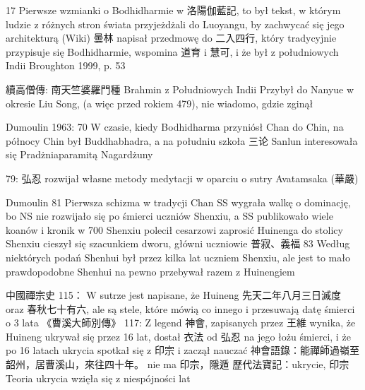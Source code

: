 17 Pierwsze wzmianki o Bodhidharmie w 洛陽伽藍記, to był tekst, w którym ludzie z różnych stron świata przyjeżdżali do Luoyangu, by zachwycać się jego architekturą
(Wiki) 曇林 napisał przedmowę do 二入四行, który tradycyjnie przypisuje się Bodhidharmie, wspomina 道育 i 慧可, i że był z południowych Indii Broughton 1999, p. 53

續高僧傳:
南天竺婆羅門種 Brahmin z Południowych Indii
Przybył do Nanyue w okresie Liu Song, (a więc przed rokiem 479), nie wiadomo, gdzie zginął

Dumoulin 1963: 70
W czasie, kiedy Bodhidharma przyniósł Chan do Chin, na północy Chin był Buddhabhadra, a na południu szkoła 三论
Sanlun interesowała się Pradżniaparamitą Nagardżuny

79: 弘忍 rozwijał własne metody medytacji w oparciu o sutry Avatamsaka (華嚴)

Dumoulin 81
Pierwsza schizma w tradycji Chan
SS wygrała walkę o dominację, bo NS nie rozwijało się po śmierci uczniów Shenxiu, a SS publikowało wiele koanów i kronik
w 700 Shenxiu polecił cesarzowi zaprosić Huinenga do stolicy
Shenxiu cieszył się szacunkiem dworu, główni uczniowie 普寂、義福
83
Według niektórych podań Shenhui był przez kilka lat uczniem Shenxiu, ale jest to mało prawdopodobne
Shenhui na pewno przebywał razem z Huinengiem

中國禪宗史 115：
W sutrze jest napisane, że Huineng 先天二年八月三日滅度 oraz 春秋七十有六, ale są stele, które mówią co innego i przesuwają datę śmierci o 3 lata
《曹溪大師別傳》
117: Z legend 神會, zapisanych przez 王維 wynika, że Huineng ukrywał się przez 16 lat, dostał 衣法 od 弘忍 na jego łożu śmierci, i że po 16 latach ukrycia spotkał się z 印宗 i zaczął nauczać
神會語錄：能禪師過嶺至韶州，居曹溪山，來往四十年。 nie ma 印宗，隱遁
歷代法寶記：ukrycie, 印宗
Teoria ukrycia wzięła się z niespójności lat
\fi
